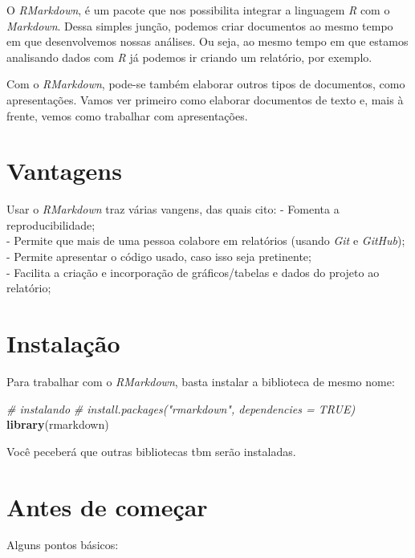 \documentclass[]{book}
\newenvironment{Shaded}{\begin{snugshade}}{\end{snugshade}}
\newcommand{\CommentTok}[1]{\textcolor[rgb]{0.56,0.35,0.01}{\textit{#1}}}
\newcommand{\KeywordTok}[1]{\textcolor[rgb]{0.13,0.29,0.53}{\textbf{#1}}}
\newcommand{\NormalTok}[1]{#1}
\begin{document}
O \emph{RMarkdown}, é um pacote que nos possibilita integrar a linguagem \emph{R} com o \emph{Markdown}. Dessa simples junção, podemos criar documentos ao mesmo tempo em que desenvolvemos nossas análises. Ou seja, ao mesmo tempo em que estamos analisando dados com \emph{R} já podemos ir criando um relatório, por exemplo.

Com o \emph{RMarkdown}, pode-se também elaborar outros tipos de documentos, como apresentações. Vamos ver primeiro como elaborar documentos de texto e, mais à frente, vemos como trabalhar com apresentações.

\hypertarget{vantagens}{%
\section{Vantagens}\label{vantagens}}

Usar o \emph{RMarkdown} traz várias vangens, das quais cito:
- Fomenta a reproducibilidade;\\
- Permite que mais de uma pessoa colabore em relatórios (usando \emph{Git} e \emph{GitHub});\\
- Permite apresentar o código usado, caso isso seja pretinente;\\
- Facilita a criação e incorporação de gráficos/tabelas e dados do projeto ao relatório;

\hypertarget{instalauxe7uxe3o}{%
\section{Instalação}\label{instalauxe7uxe3o}}

Para trabalhar com o \emph{RMarkdown}, basta instalar a biblioteca de mesmo nome:

\begin{Shaded}
\begin{Highlighting}[]
\CommentTok{# instalando}
\CommentTok{# install.packages("rmarkdown", dependencies = TRUE)}
\KeywordTok{library}\NormalTok{(rmarkdown)}
\end{Highlighting}
\end{Shaded}

Você peceberá que outras bibliotecas tbm serão instaladas.

\hypertarget{AntesComecar}{%
\section{Antes de começar}\label{AntesComecar}}

Alguns pontos básicos:
\end{document}
